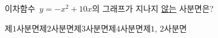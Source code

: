 이차함수~$y=-x^2+10x$의 그래프가 지나지 \underline{않는} 사분면은?
\begin{choices32}{제$1$사분면}{제$2$사분면}{제$3$사분면}{제$4$사분면}{제$1$, $2$사분면}\end{choices32}
